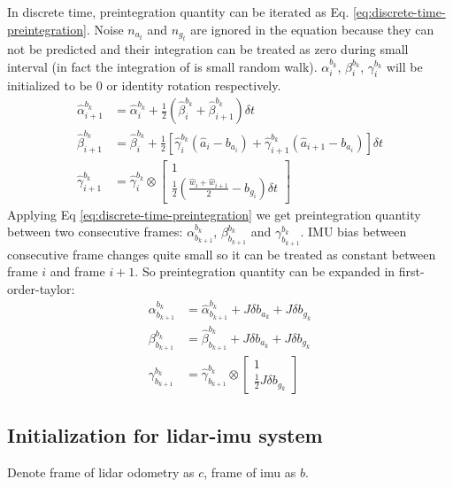 In discrete time, preintegration quantity can be iterated as Eq. \ref{eq:discrete-time-preintegration}. Noise $n_{a_t}$ and $n_{g_t}$ are ignored in the equation because they can not be predicted and their integration can be treated as zero during small interval (in fact the integration of is small random walk). $\alpha_i^{b_k}$, $\beta_i^{b_k}$, $\gamma_i^{b_k}$ will be initialized to be 0 or identity rotation respectively.
\begin{equation} \label{eq:discrete-time-preintegration}
	\begin{split}
		\hat{\alpha}_{i+1}^{b_k} &= \hat{\alpha}_i^{b_k} + \frac12(\hat{\beta}_i^{b_k}+\hat{\beta}_{i+1}^{b_k})\delta{t} \\
		\hat{\beta}_{i+1}^{b_k} &= \hat{\beta}_i^{b_k} + \frac12\left[\hat{\gamma}_i^{b_k}(\hat{a}_i-b_{a_i})+\hat{\gamma}_{i+1}^{b_k}(\hat{a}_{i+1}-b_{a_i})\right]\delta{t} \\
		\hat{\gamma}_{i+1}^{b_k} &= \hat{\gamma}_i^{b_k} \otimes
		\begin{bmatrix}
			1 \\ \frac12(\frac{\hat{w}_i+\hat{w}_{i+1}}2-b_{g_i})\delta{t}
		\end{bmatrix}
	\end{split}
\end{equation}
Applying Eq \ref{eq:discrete-time-preintegration} we get preintegration quantity between two consecutive frames: $\alpha_{b_{k+1}}^{b_k}$, $\beta_{b_{k+1}}^{b_k}$ and $\gamma_{b_{k+1}}^{b_k}$. IMU bias between consecutive frame changes quite small so it can be treated as constant between frame $i$ and frame $i+1$.
So preintegration quantity can be expanded in first-order-taylor:
\begin{equation}
	\begin{split}
		\alpha_{b_{k+1}}^{b_k} &= \hat{\alpha}_{b_{k+1}}^{b_k}+J\delta{b_{a_k}}+J\delta{b_{g_k}} \\
		\beta_{b_{k+1}}^{b_k} &= \hat{\beta}_{b_{k+1}}^{b_k}+J\delta{b_{a_k}}+J\delta{b_{g_k}} \\
		\gamma_{b_{k+1}}^{b_k} &= \hat{\gamma}_{b_{k+1}}^{b_k} \otimes
		\begin{bmatrix}
			1 \\\frac12J\delta{b_{g_k}}
		\end{bmatrix}
	\end{split}
\end{equation}

\subsection{Initialization for lidar-imu system}
\par Denote frame of lidar odometry as $c$, frame of imu as $b$.
